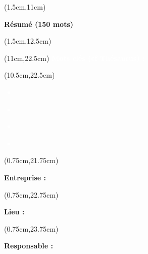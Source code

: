 \begin{titlepage}
    \begin{textblock*}{18cm}(1.5cm,11cm)
        \begin{center}
            \normalsize
            \textbf{\textcolor{bleuRoiUTT}{Résumé (150 mots)}}
        \end{center}
    \end{textblock*}

    \begin{textblock*}{18cm}(1.5cm,12.5cm)
        {
            \normalsize
            \setlength{\parindent}{0pt}
            \titletext
        }
    \end{textblock*}

    \begin{textblock*}{9cm}(11cm,22.5cm)
        \normalsize
        \centering
        \textbf{\textcolor{white}{Mots clés (cf Thésaurus) :}}
    \end{textblock*}

    \begin{textblock*}{10cm}(10.5cm,22.5cm)
        \small
        \textcolor{white}{
            \begin{itemize}[label=\textcolor{white}{\textbullet}]
                \item \textbf{\theKone}
                \item \textbf{\theKtwo}
                \item \textbf{\theKthree}
                \item \textbf{\theKfourth}
            \end{itemize}
        }
    \end{textblock*}

    \begin{textblock*}{8.5cm}(0.75cm,21.75cm)
        \normalsize
        \raggedright
        \justify
        \textbf{\textcolor{bleuRoiUTT}{Entreprise :} \theEntreprise}
    \end{textblock*}

    \begin{textblock*}{8.5cm}(0.75cm,22.75cm)
        \normalsize
        \raggedright
        \justify
        \textbf{\textcolor{bleuRoiUTT}{Lieu :} \textit{\mapAddr{\theLieu}}}
    \end{textblock*}

    \begin{textblock*}{8.5cm}(0.75cm,23.75cm)
        \normalsize
        \raggedright
        \justify
        \textbf{\textcolor{bleuRoiUTT}{Responsable :} \theREntre}
    \end{textblock*}

\end{titlepage}

\clearpage %